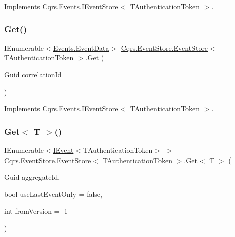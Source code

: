Implements \hyperlink{interfaceCqrs_1_1Events_1_1IEventStore_ae02ef6c804d0c4a92705a447bc4b2214}{Cqrs.\+Events.\+I\+Event\+Store$<$ T\+Authentication\+Token $>$}.

\mbox{\label{classCqrs_1_1EventStore_1_1EventStore_a898b51899af27db8aa0fb0c0dc75b25d}} 
\subsubsection{\texorpdfstring{Get()}{Get()}\hspace{0.1cm}{\footnotesize\ttfamily [2/2]}}
{\footnotesize\ttfamily I\+Enumerable$<$\hyperlink{classCqrs_1_1Events_1_1EventData}{Events.\+Event\+Data}$>$ \hyperlink{classCqrs_1_1EventStore_1_1EventStore}{Cqrs.\+Event\+Store.\+Event\+Store}$<$ T\+Authentication\+Token $>$.Get (\begin{DoxyParamCaption}\item[{Guid}]{correlation\+Id }\end{DoxyParamCaption})}



Implements \hyperlink{interfaceCqrs_1_1Events_1_1IEventStore_af398bb6768fa661ad97a9fa9ecfbd9fb}{Cqrs.\+Events.\+I\+Event\+Store$<$ T\+Authentication\+Token $>$}.

\mbox{\label{classCqrs_1_1EventStore_1_1EventStore_aaa4ebd61c84124425380ce31e3a67600}} 
\subsubsection{\texorpdfstring{Get$<$ T $>$()}{Get< T >()}}
{\footnotesize\ttfamily I\+Enumerable$<$\hyperlink{interfaceCqrs_1_1Events_1_1IEvent}{I\+Event}$<$T\+Authentication\+Token$>$ $>$ \hyperlink{classCqrs_1_1EventStore_1_1EventStore}{Cqrs.\+Event\+Store.\+Event\+Store}$<$ T\+Authentication\+Token $>$.\hyperlink{classCqrs_1_1EventStore_1_1EventStore_a9d7b3a3ebcf110fe02d53e2ada19933d}{Get}$<$ T $>$ (\begin{DoxyParamCaption}\item[{Guid}]{aggregate\+Id,  }\item[{bool}]{use\+Last\+Event\+Only = {\ttfamily false},  }\item[{int}]{from\+Version = {\ttfamily -\/1} }\end{DoxyParamCaption})}


